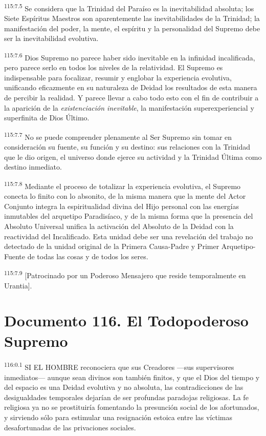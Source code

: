 \documentclass[twoside, 11pt]{book}
\begin{document}
\par
\textsuperscript{115:7.5} Se considera que la Trinidad del Paraíso es la inevitabilidad absoluta; los Siete Espíritus Maestros son aparentemente las inevitabilidades de la Trinidad; la manifestación del poder, la mente, el espíritu y la personalidad del Supremo debe ser la inevitabilidad evolutiva.

\par
\textsuperscript{115:7.6} Dios Supremo no parece haber sido inevitable en la infinidad incalificada, pero parece serlo en todos los niveles de la relatividad. El Supremo es indispensable para focalizar, resumir y englobar la experiencia evolutiva, unificando eficazmente en su naturaleza de Deidad los resultados de esta manera de percibir la realidad. Y parece llevar a cabo todo esto con el fin de contribuir a la aparición de la \textit{existenciación inevitable}, la manifestación superexperiencial y superfinita de Dios
Último.

\par
\textsuperscript{115:7.7} No se puede comprender plenamente al Ser Supremo sin tomar en consideración su fuente, su función y su destino: sus relaciones con la Trinidad que le dio origen, el universo donde ejerce su actividad y la Trinidad Última como destino inmediato.

\par
\textsuperscript{115:7.8} Mediante el proceso de totalizar la experiencia evolutiva, el Supremo conecta lo finito con lo absonito, de la misma manera que la mente del Actor Conjunto integra la espiritualidad divina del Hijo personal con las energías inmutables del arquetipo Paradisíaco, y de la misma forma que la presencia del Absoluto Universal unifica la activación del Absoluto de la Deidad con la reactividad del Incalificado. Esta unidad debe ser una revelación del trabajo no detectado de la unidad original de la Primera Causa-Padre y Primer Arquetipo-Fuente de todas las cosas y de todos los seres.

\par
\textsuperscript{115:7.9} [Patrocinado por un Poderoso Mensajero que reside temporalmente en Urantia].


\chapter{Documento 116. El Todopoderoso Supremo}
\par
\textsuperscript{116:0.1} SI EL HOMBRE reconociera que sus Creadores ---sus supervisores inmediatos--- aunque sean divinos son también finitos, y que el Dios del tiempo y del espacio es una Deidad evolutiva y no absoluta, las contradicciones de las desigualdades temporales dejarían de ser profundas paradojas religiosas. La fe religiosa ya no se prostituiría fomentando la presunción social de los afortunados, y sirviendo sólo para estimular una resignación estoica entre las víctimas desafortunadas de las privaciones sociales.
\end{document}
